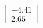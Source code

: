 \documentclass[preview]{standalone}
\begin{document}
\begin{align*}
\begin{bmatrix} -4.41 \\ 2.65 \end{bmatrix}
\end{align*}
\end{document}
